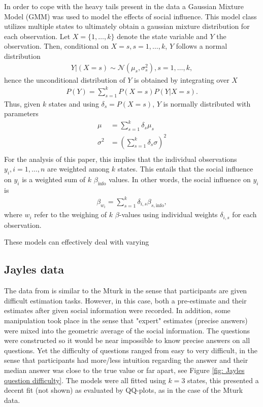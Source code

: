 \documentclass[9pt,twoside,lineno]{pnas-new}
\begin{document}
In order to cope with the heavy tails present in the data a Gaussian Mixture Model (GMM) was used to model the effects of social influence. This model class utilizes multiple states to ultimately obtain a gaussian mixture distribution for each observation. Let $X=\{1,\dots,k\}$ denote the state variable and $Y$ the observation. Then, conditional on $X=s, s=1,\dots,k$, $Y$ follows a normal distribution
\begin{align*}
	Y|(X=s)  \sim \mathcal{N} (\mu_s,\sigma^2_s), s=1,\dots,k,
\end{align*}
hence the unconditional distribution of $Y$ is obtained by integrating over $X$
\begin{align*}
	P(Y) = \sum_{s=1}^k P(X=s)P(Y|X=s).
\end{align*}
Thus, given $k$ states and using $\delta_s = P(X=s)$, $Y$ is normally distributed with parameters
\begin{align*}
	\mu &= \sum_{s=1}^k \delta_s \mu_s \\
	\sigma^2 &= \left(\sum_{s=1}^k \delta_s \sigma\right)^2 \\
\end{align*}
For the analysis of this paper, this implies that the individual observations $y_i, i=1,\dots,n$ are weighted among $k$ states. This entails that the social influence on $y_i$ is a weighted sum of $k$ $\beta_\text{info}$ values. In other words, the social influence on $y_i$ is
\begin{align*}
	\beta_{w_i}	 = \sum_{s=1}^k \delta_{i,s}\beta_{s,\text{info}},
\end{align*}
where $w_i$ refer to the weighing of $k$ $\beta$-values using individual weights $\delta_{i,s}$ for each observation.

These models can effectively deal with varying 
 



\subsection*{Jayles data}
The data from \citep{jayles2017social} is similar to the Mturk in the sense that participants are given difficult estimation tasks. However, in this case, both a pre-estimate and their estimates after given social information were recorded. In addition, some manipulation took place in the sense that "expert" estimates (precise answers) were mixed into the geometric average of the social information. The questions were constructed so it would be near impossible to know precise answers on all questions. Yet the difficulty of questions ranged from easy to very difficult, in the sense that participants had more/less intuition regarding the answer and their median answer was close to the true value or far apart, see Figure \ref{fig: Jayles question difficulty}. The models were all fitted using $k=3$ states, this presented a decent fit (not shown) as evaluated by QQ-plots, as in the case of the Mturk data. 
\end{document}
